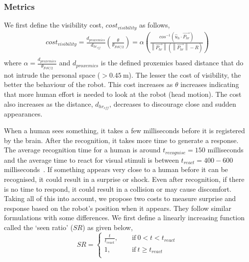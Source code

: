 \subsubsection{Metrics}
We first define the visibility cost, $cost_{visibility}$ as follows,
\begin{equation}
    \begin{gathered}
        cost_{visibility} = \frac{d_{proxemics}}{d_{hr_{eff}}}\left(\frac{\theta}{\theta_{FoV/2}}\right) = \alpha\left( \frac{cos^{-1}\left(\hat{u}_h\cdot\overrightarrow{P_{hr}}\right)}{\left\lVert \overrightarrow{P_{hr}} \right\rVert\left( \left\lVert \overrightarrow{P_{hr}} \right\rVert - R\right)}\right)\\
    \end{gathered}
\end{equation}
where $\alpha = \frac{d_{proxemics}}{\theta_{FoV/2}}$ and $d_{proxemics}$ is the defined proxemics based distance that do not intrude the personal space ($> \SI{0.45}{\metre}$). The lesser the cost of visibility, the better the behaviour of the robot. This cost increases as $\theta$ increases indicating that more human effort is needed to look at the robot (head motion). The cost also increases as the distance, $d_{hr_{eff}}$, decreases to discourage close and sudden appearances.

When a human sees something, it takes a few milliseconds before it is registered by the brain. After the recognition, it takes more time to generate a response. The average recognition time for a human is around $t_{recognise}= 150$ milliseconds~\cite{thorpe1996speed, rayner2009eye} and the average time to react for visual stimuli is between $t_{react}=400-600$ milliseconds~\cite{eckner2012novel, wolfe2020rapid}. If something appears very close to a human before it can be recognised, it could result in a surprise or shock. Even after recognition, if there is no time to respond, it could result in a collision or may cause discomfort. Taking all of this into account, we propose two costs to measure surprise and response based on the robot's position when it appears. They follow similar formulations with some differences. We first define a linearly increasing function called the `seen ratio' ($SR$) as given below,
\begin{equation}
    SR  = \begin{cases}
       \frac{t}{t_{react}},\ &\quad\text{if} \ 0<t<t_{react}\\
       1,&\quad\text{if} \ t\geq t_{react}\\
     \end{cases}
\end{equation}

